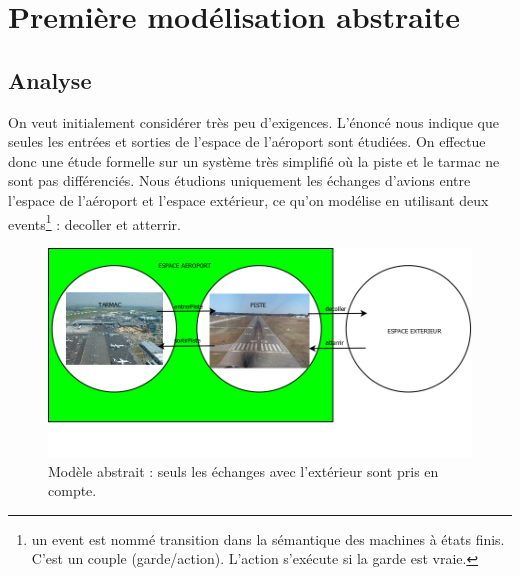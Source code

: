 \section{Première modélisation abstraite}
	
\subsection{Analyse}
   On veut initialement considérer très peu d'exigences. L'énoncé nous indique
   que seules les entrées et sorties de l'espace de l'aéroport sont étudiées. On effectue donc une étude formelle sur un système très simplifié où la piste et le tarmac ne sont pas différenciés. Nous étudions uniquement les échanges d'avions entre l'espace de l'aéroport et l'espace extérieur, ce qu'on modélise en utilisant deux events\footnote{un event est nommé transition dans la sémantique des machines à états finis. C'est un couple (garde/action). L'action s'exécute si la garde est vraie.} : decoller et atterrir.
   
  

\begin{figure}[H]
	\begin{center}	
		\includegraphics[scale=0.4]{images/0/mod0}
		\caption{Modèle abstrait : seuls les échanges avec l'extérieur sont pris en compte.}
		\label{mod0}
	\end{center}
\end{figure}


